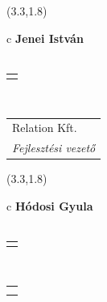 \documentclass[11pt]{article}
\begin{document}
\makebox(3.3,1.8){
  \renewcommand\arraystretch{1.3}
  \begin{tabular}[c]{c}
    \hspace{8.5mm}
    \LARGE\bf{ Jenei István }\\
    \hspace{8.5mm}
    \Large{  }\\
    \renewcommand\arraystretch{3}
    \begin{tabular}[c]{c}
      \centering
      \fontfamily{phv}\selectfont{
        \textbf{
          \textsc{
            \scriptsize{
            \color{Dark}{ Ismerkedő }\color{Bright}{ Webmester }\color{Bright}{ Sminkmester }\color{Bright}{ Programozó }
            }
          }
        }
      }
    \end{tabular}
    \\
    \renewcommand\arraystretch{1}
    \begin{tabular}{p{3.3in}}
      \hspace{.7cm}Relation Kft.\\
      \hspace{.7cm}\emph{ Fejlesztési vezető }\\
    \end{tabular}
  \end{tabular}
}

\makebox(3.3,1.8){
  \renewcommand\arraystretch{1.3}
  \begin{tabular}[c]{c}
    \hspace{8.5mm}
    \LARGE\bf{ Hódosi Gyula }\\
    \hspace{8.5mm}
    \Large{  }\\
    \renewcommand\arraystretch{3}
    \begin{tabular}[c]{c}
      \centering
      \fontfamily{phv}\selectfont{
        \textbf{
          \textsc{
            \scriptsize{
            \color{Dark}{ Ismerkedő }\color{Bright}{ Webmester }\color{Bright}{ Sminkmester }\color{Bright}{ Programozó }
            }
          }
        }
      }
    \end{tabular}
    \\
    \renewcommand\arraystretch{1}
    \begin{tabular}{p{3.3in}}
      \hspace{.7cm}\\
      \hspace{.7cm}\emph{  }\\
    \end{tabular}
  \end{tabular}
}
\end{document}

